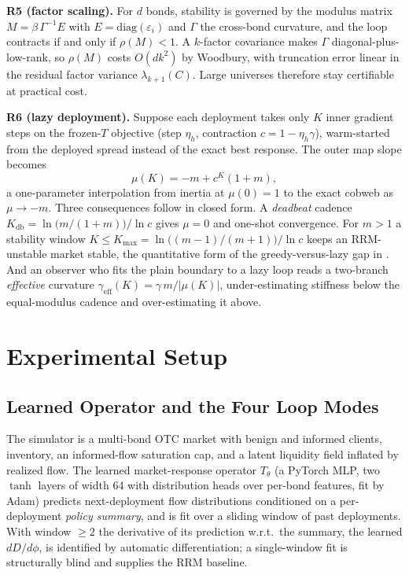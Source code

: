 \documentclass[sigconf,anonymous,review]{acmart}
\newcommand{\eps}{\varepsilon}
\newcommand{\geff}{\gamma_{\mathrm{eff}}}
\newcommand{\Kdb}{K_{\mathrm{db}}}
\newcommand{\Kmax}{K_{\max}}
\begin{document}
\textbf{R5 (factor scaling).} For $d$ bonds, stability is governed by the
modulus matrix $M=\beta\,\Gamma^{-1}E$ with
$E=\mathrm{diag}(\eps_i)$ and $\Gamma$ the cross-bond curvature, and the loop
contracts if and only if $\rho(M)<1$. A $k$-factor covariance makes $\Gamma$
diagonal-plus-low-rank, so $\rho(M)$ costs $O(dk^2)$ by Woodbury, with
truncation error linear in the residual factor variance $\lambda_{k+1}(C)$.
Large universes therefore stay certifiable at practical cost.

\textbf{R6 (lazy deployment).} Suppose each deployment takes only $K$ inner
gradient steps on the frozen-$T$ objective (step $\eta_h$,
contraction $c=1-\eta_h\gamma$), warm-started from the deployed spread
instead of the exact best response. The outer map slope becomes
\begin{equation}
\mu(K)=-m+c^K(1+m),
\label{eq:lazy}
\end{equation}
a one-parameter interpolation from inertia at $\mu(0)=1$ to the exact cobweb
as $\mu\to-m$. Three consequences follow in closed form. A \emph{deadbeat}
cadence $\Kdb=\ln\!\big(m/(1+m)\big)/\ln c$ gives $\mu=0$ and one-shot
convergence. For $m>1$ a stability window $K\le\Kmax=
\ln\!\big((m-1)/(m+1)\big)/\ln c$ keeps an RRM-unstable market stable, the
quantitative form of the greedy-versus-lazy gap in
\cite{perdomo2020performative,mendlerdunner2020stochastic}. And an observer
who fits the plain boundary to a lazy loop reads a two-branch \emph{effective}
curvature $\geff(K)=\gamma\,m/|\mu(K)|$, under-estimating stiffness below the
equal-modulus cadence and over-estimating it above.

\section{Experimental Setup}
\label{sec:system}

\subsection{Learned Operator and the Four Loop Modes}
The simulator is a multi-bond OTC market with benign and informed clients,
inventory, an informed-flow saturation cap, and a latent liquidity field
inflated by realized flow. The learned market-response operator $T_\theta$
(a PyTorch MLP, two $\tanh$ layers of width 64 with distribution heads over
per-bond features, fit by Adam) predicts next-deployment flow
distributions conditioned on a per-deployment \emph{policy summary}, and is
fit over a sliding window of past deployments. With window $\ge2$ the
derivative of its prediction w.r.t.\ the summary, the learned $dD/d\phi$, is
identified by automatic differentiation; a single-window fit is structurally
blind and supplies the RRM baseline.
\end{document}
